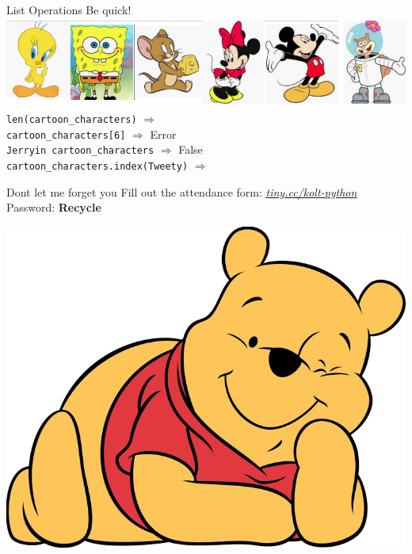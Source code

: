     \begin{frame}{List Operations}
        \Large
        Be quick!\\
        \includegraphics[width=\textwidth]{images/list_cartoons/list_after_insert.png}     
        \texttt{len(cartoon\_characters)}  $\Rightarrow$ \\
        \pause \texttt{cartoon\_characters[6]}  $\Rightarrow$ \pause Error\\
        \pause \texttt{\textquotesingle Jerry\textquotesingle  in cartoon\_characters}  $\Rightarrow$ \pause False\\
        \pause \texttt{cartoon\_characters.index(\textquotesingle Tweety\textquotesingle )}  $\Rightarrow$ \\
    \end{frame}

    \begin{frame}{Don\textquotesingle t let me forget you}
        \pause
        \Large
        Fill out the attendance form: \href{https://tiny.cc/kolt-python}{\underline{\textit{tiny.cc/kolt-python}}}\\
        \pause
            Password: \textbf{Recycle}
        \pause
        \begin{center}
            \includegraphics[height=0.60\textheight]{images/winnie.jpg}                
        \end{center}
    \end{frame}

